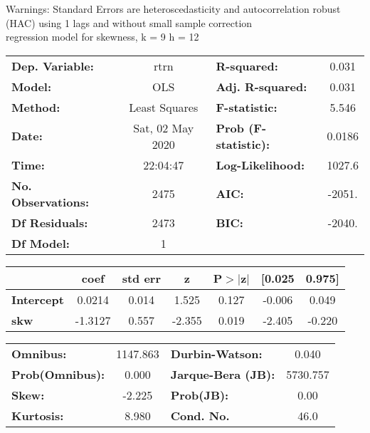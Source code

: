 Warnings: \newline
 [1] Standard Errors are heteroscedasticity and autocorrelation robust (HAC) using 1 lags and without small sample correction\\ 

regression model for skewness, k = 9 h = 12\begin{center}
\begin{tabular}{lclc}
\toprule
\textbf{Dep. Variable:}    &       rtrn       & \textbf{  R-squared:         } &     0.031   \\
\textbf{Model:}            &       OLS        & \textbf{  Adj. R-squared:    } &     0.031   \\
\textbf{Method:}           &  Least Squares   & \textbf{  F-statistic:       } &     5.546   \\
\textbf{Date:}             & Sat, 02 May 2020 & \textbf{  Prob (F-statistic):} &   0.0186    \\
\textbf{Time:}             &     22:04:47     & \textbf{  Log-Likelihood:    } &    1027.6   \\
\textbf{No. Observations:} &        2475      & \textbf{  AIC:               } &    -2051.   \\
\textbf{Df Residuals:}     &        2473      & \textbf{  BIC:               } &    -2040.   \\
\textbf{Df Model:}         &           1      & \textbf{                     } &             \\
\bottomrule
\end{tabular}
\begin{tabular}{lcccccc}
                   & \textbf{coef} & \textbf{std err} & \textbf{z} & \textbf{P$> |$z$|$} & \textbf{[0.025} & \textbf{0.975]}  \\
\midrule
\textbf{Intercept} &       0.0214  &        0.014     &     1.525  &         0.127        &       -0.006    &        0.049     \\
\textbf{skw}       &      -1.3127  &        0.557     &    -2.355  &         0.019        &       -2.405    &       -0.220     \\
\bottomrule
\end{tabular}
\begin{tabular}{lclc}
\textbf{Omnibus:}       & 1147.863 & \textbf{  Durbin-Watson:     } &    0.040  \\
\textbf{Prob(Omnibus):} &   0.000  & \textbf{  Jarque-Bera (JB):  } & 5730.757  \\
\textbf{Skew:}          &  -2.225  & \textbf{  Prob(JB):          } &     0.00  \\
\textbf{Kurtosis:}      &   8.980  & \textbf{  Cond. No.          } &     46.0  \\
\bottomrule
\end{tabular}
\end{center}

